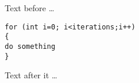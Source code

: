 \documentclass{article}
\begin{document}
Text before \dots
\begin{lstlisting}
for (int i=0; i<iterations;i++)
{
do something
}
\end{lstlisting}
Text after it \dots
\end{document}
